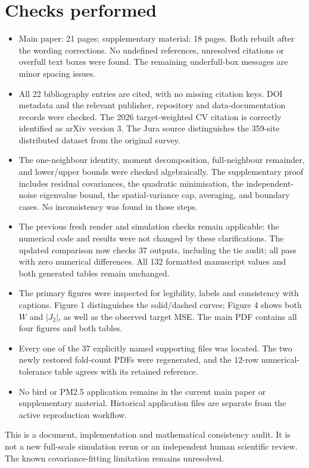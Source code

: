 \documentclass[11pt,a4paper]{article}
\begin{document}
\section*{Checks performed}
\begin{itemize}
\item Main paper: 21 pages; supplementary material: 18 pages. Both rebuilt after the wording corrections. No undefined references, unresolved citations or overfull text boxes were found. The remaining underfull-box messages are minor spacing issues.
\item All 22 bibliography entries are cited, with no missing citation keys. DOI metadata and the relevant publisher, repository and data-documentation records were checked. The 2026 target-weighted CV citation is correctly identified as arXiv version 3. The Jura source distinguishes the 359-site distributed dataset from the original survey.
\item The one-neighbour identity, moment decomposition, full-neighbour remainder, and lower/upper bounds were checked algebraically. The supplementary proof includes residual covariances, the quadratic minimisation, the independent-noise eigenvalue bound, the spatial-variance cap, averaging, and boundary cases. No inconsistency was found in those steps.
\item The previous fresh render and simulation checks remain applicable: the numerical code and results were not changed by these clarifications. The updated comparison now checks 37 outputs, including the tie audit; all pass with zero numerical differences. All 132 formatted manuscript values and both generated tables remain unchanged.
\item The primary figures were inspected for legibility, labels and consistency with captions. Figure 1 distinguishes the solid/dashed curves; Figure 4 shows both $W$ and $|J_2|$, as well as the observed target MSE. The main PDF contains all four figures and both tables.
\item Every one of the 37 explicitly named supporting files was located. The two newly restored fold-count PDFs were regenerated, and the 12-row numerical-tolerance table agrees with its retained reference.
\item No bird or PM2.5 application remains in the current main paper or supplementary material. Historical application files are separate from the active reproduction workflow.
\end{itemize}

This is a document, implementation and mathematical consistency audit. It is not a new full-scale simulation rerun or an independent human scientific review. The known covariance-fitting limitation remains unresolved.
\end{document}
